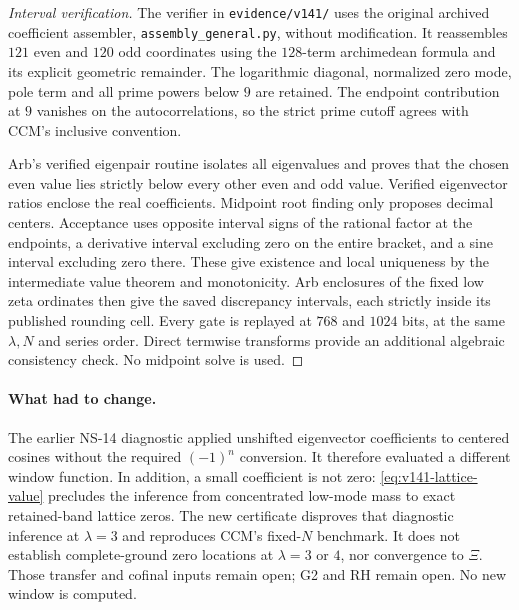 \begin{proof}[Interval verification]
The verifier in \texttt{evidence/v141/} uses the original archived
coefficient assembler, \texttt{assembly\_general.py}, without modification.
It reassembles $121$ even and $120$ odd coordinates using the
$128$-term archimedean formula and its explicit geometric remainder.
The logarithmic diagonal, normalized zero mode, pole term and all
prime powers below $9$ are retained. The endpoint contribution at
$9$ vanishes on the autocorrelations, so the strict prime cutoff
agrees with CCM's inclusive convention.

Arb's verified eigenpair routine isolates all eigenvalues and proves
that the chosen even value lies strictly below every other even and
odd value. Verified eigenvector ratios enclose the real coefficients.
Midpoint root finding only proposes decimal centers. Acceptance uses
opposite interval signs of the rational factor at the endpoints,
a derivative interval excluding zero on the entire bracket, and a
sine interval excluding zero there. These give existence and local
uniqueness by the intermediate value theorem and monotonicity.
Arb enclosures of the fixed low zeta ordinates then give the saved
discrepancy intervals, each strictly inside its published rounding
cell. Every gate is replayed at $768$ and $1024$ bits, at the same
$\lambda,N$ and series order. Direct termwise transforms provide an
additional algebraic consistency check. No midpoint solve is used.
\end{proof}

\paragraph{What had to change.}
The earlier NS-14 diagnostic applied unshifted eigenvector coefficients
to centered cosines without the required $(-1)^n$ conversion. It
therefore evaluated a different window function. In addition, a small
coefficient is not zero: \eqref{eq:v141-lattice-value} precludes the
inference from concentrated low-mode mass to exact retained-band
lattice zeros. The new certificate disproves that diagnostic inference
at $\lambda=3$ and reproduces CCM's fixed-$N$ benchmark. It does not
establish complete-ground zero locations at $\lambda=3$ or $4$, nor
convergence to $\Xi$. Those transfer and cofinal inputs remain open;
G2 and RH remain open. No new window is computed.
